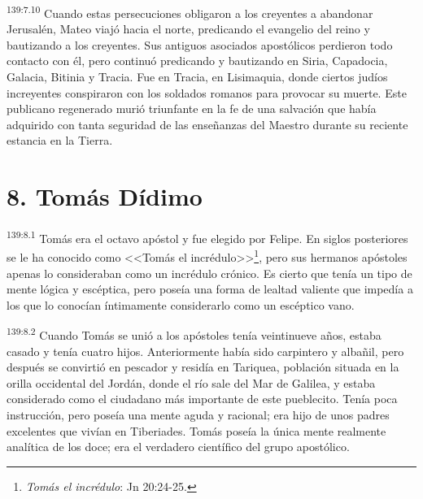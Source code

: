 \par 
\textsuperscript{139:7.10} Cuando estas persecuciones obligaron a los creyentes a abandonar Jerusalén, Mateo viajó hacia el norte, predicando el evangelio del reino y bautizando a los creyentes. Sus antiguos asociados apostólicos perdieron todo contacto con él, pero continuó predicando y bautizando en Siria, Capadocia, Galacia, Bitinia y Tracia. Fue en Tracia, en Lisimaquia, donde ciertos judíos increyentes conspiraron con los soldados romanos para provocar su muerte. Este publicano regenerado murió triunfante en la fe de una salvación que había adquirido con tanta seguridad de las enseñanzas del Maestro durante su reciente estancia en la Tierra.

\section*{8. Tomás Dídimo}
\par 
\textsuperscript{139:8.1} Tomás era el octavo apóstol y fue elegido por Felipe. En siglos posteriores se le ha conocido como <<Tomás el incrédulo>>\footnote{\textit{Tomás el incrédulo}: Jn 20:24-25.}, pero sus hermanos apóstoles apenas lo consideraban como un incrédulo crónico. Es cierto que tenía un tipo de mente lógica y escéptica, pero poseía una forma de lealtad valiente que impedía a los que lo conocían íntimamente considerarlo como un escéptico vano.

\par 
\textsuperscript{139:8.2} Cuando Tomás se unió a los apóstoles tenía veintinueve años, estaba casado y tenía cuatro hijos. Anteriormente había sido carpintero y albañil, pero después se convirtió en pescador y residía en Tariquea, población situada en la orilla occidental del Jordán, donde el río sale del Mar de Galilea, y estaba considerado como el ciudadano más importante de este pueblecito. Tenía poca instrucción, pero poseía una mente aguda y racional; era hijo de unos padres excelentes que vivían en Tiberiades. Tomás poseía la única mente realmente analítica de los doce; era el verdadero científico del grupo apostólico.

